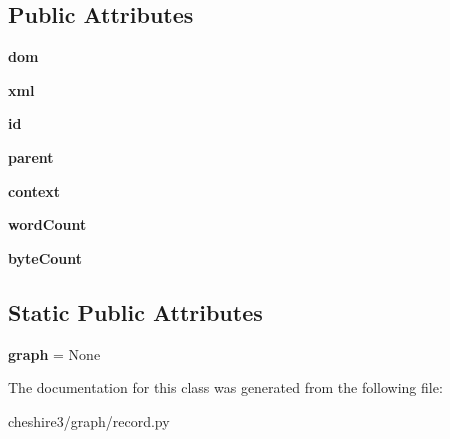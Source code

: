 \subsection*{Public Attributes}
\begin{DoxyCompactItemize}
\item 
\hypertarget{classcheshire3_1_1graph_1_1record_1_1_graph_record_ab9ce4d63d208360e9454df5aac3e4909}{{\bfseries dom}}\label{classcheshire3_1_1graph_1_1record_1_1_graph_record_ab9ce4d63d208360e9454df5aac3e4909}

\item 
\hypertarget{classcheshire3_1_1graph_1_1record_1_1_graph_record_a17109750cfa276f6a6283c78a33f0067}{{\bfseries xml}}\label{classcheshire3_1_1graph_1_1record_1_1_graph_record_a17109750cfa276f6a6283c78a33f0067}

\item 
\hypertarget{classcheshire3_1_1graph_1_1record_1_1_graph_record_a9c51dc0ab4d02277275f3a4a3d5d407a}{{\bfseries id}}\label{classcheshire3_1_1graph_1_1record_1_1_graph_record_a9c51dc0ab4d02277275f3a4a3d5d407a}

\item 
\hypertarget{classcheshire3_1_1graph_1_1record_1_1_graph_record_a0aca3f38631b9342aaa269eff33e4fd6}{{\bfseries parent}}\label{classcheshire3_1_1graph_1_1record_1_1_graph_record_a0aca3f38631b9342aaa269eff33e4fd6}

\item 
\hypertarget{classcheshire3_1_1graph_1_1record_1_1_graph_record_a6f7e652eff4b46420ec31023440e864e}{{\bfseries context}}\label{classcheshire3_1_1graph_1_1record_1_1_graph_record_a6f7e652eff4b46420ec31023440e864e}

\item 
\hypertarget{classcheshire3_1_1graph_1_1record_1_1_graph_record_ad1651869e4d1742e0b79a00be91088ea}{{\bfseries word\-Count}}\label{classcheshire3_1_1graph_1_1record_1_1_graph_record_ad1651869e4d1742e0b79a00be91088ea}

\item 
\hypertarget{classcheshire3_1_1graph_1_1record_1_1_graph_record_a579a4a537c73c567255cd5be216e9d65}{{\bfseries byte\-Count}}\label{classcheshire3_1_1graph_1_1record_1_1_graph_record_a579a4a537c73c567255cd5be216e9d65}

\end{DoxyCompactItemize}
\subsection*{Static Public Attributes}
\begin{DoxyCompactItemize}
\item 
\hypertarget{classcheshire3_1_1graph_1_1record_1_1_graph_record_aa797e76eb9d2b147163b642cafde4dc0}{{\bfseries graph} = None}\label{classcheshire3_1_1graph_1_1record_1_1_graph_record_aa797e76eb9d2b147163b642cafde4dc0}

\end{DoxyCompactItemize}


The documentation for this class was generated from the following file\-:\begin{DoxyCompactItemize}
\item 
cheshire3/graph/record.\-py\end{DoxyCompactItemize}
